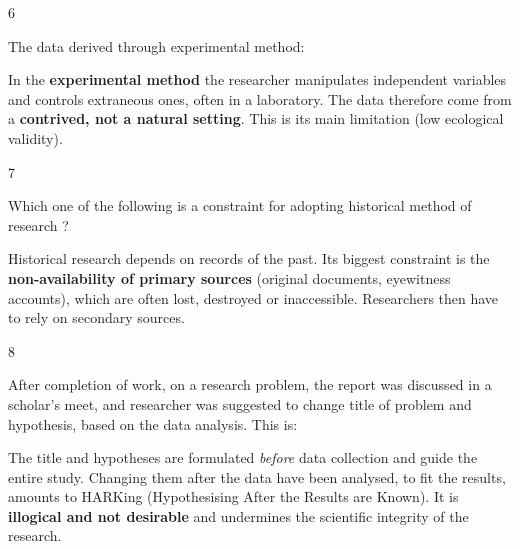 \begin{question}{6}
{The data derived through experimental method:\par}
\begin{explain}
In the \textbf{experimental method} the researcher manipulates independent variables and controls extraneous ones, often in a laboratory. The data therefore come from a \textbf{contrived, not a natural setting}. This is its main limitation (low ecological validity).
\end{explain}
\end{question}

\begin{question}{7}
{Which one of the following is a constraint for adopting historical method of research ?\par}
\begin{explain}
Historical research depends on records of the past. Its biggest constraint is the \textbf{non-availability of primary sources} (original documents, eyewitness accounts), which are often lost, destroyed or inaccessible. Researchers then have to rely on secondary sources.
\end{explain}
\end{question}

\begin{question}{8}
{After completion of work, on a research problem, the report was discussed in a scholar's meet, and researcher was suggested to change title of problem and hypothesis, based on the data analysis. This is:\par}
\begin{explain}
The title and hypotheses are formulated \emph{before} data collection and guide the entire study. Changing them after the data have been analysed, to fit the results, amounts to HARKing (Hypothesising After the Results are Known). It is \textbf{illogical and not desirable} and undermines the scientific integrity of the research.
\end{explain}
\end{question}

